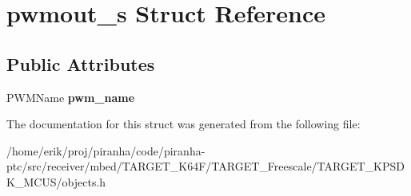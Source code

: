 \hypertarget{structpwmout__s}{}\section{pwmout\+\_\+s Struct Reference}
\label{structpwmout__s}
\subsection*{Public Attributes}
\begin{DoxyCompactItemize}
\item 
P\+W\+M\+Name {\bfseries pwm\+\_\+name}\hypertarget{structpwmout__s_a0eca5233963057234c67d5fd16dcbde3}{}\label{structpwmout__s_a0eca5233963057234c67d5fd16dcbde3}

\end{DoxyCompactItemize}


The documentation for this struct was generated from the following file\+:\begin{DoxyCompactItemize}
\item 
/home/erik/proj/piranha/code/piranha-\/ptc/src/receiver/mbed/\+T\+A\+R\+G\+E\+T\+\_\+\+K64\+F/\+T\+A\+R\+G\+E\+T\+\_\+\+Freescale/\+T\+A\+R\+G\+E\+T\+\_\+\+K\+P\+S\+D\+K\+\_\+\+M\+C\+U\+S/objects.\+h\end{DoxyCompactItemize}
